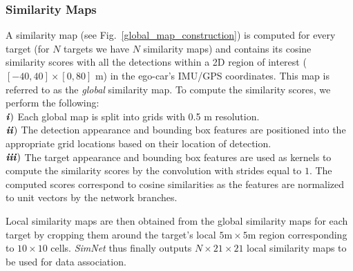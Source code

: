 \documentclass[letterpaper, 10 pt, conference]{ieeeconf}
\begin{document}
\subsubsection{Similarity Maps}
 A similarity map (see Fig.~\ref{global_map_construction}) is computed for every target (for $N$ targets we have $N$ similarity maps) and contains its cosine similarity scores with all the detections within a 2D region of interest ($\left[ -40,40 \right] \times \left [ 0,80\right]$ \si{\m}) in the ego-car's IMU/GPS coordinates. This map is referred to as the \textit{global} similarity map. To compute the similarity scores, we perform the following:
 \\ $\textbf{\textit{i}})$ Each global map is split into grids with 0.5 \si{\m} resolution.
 \\ $\textbf{\textit{ii}})$ The detection appearance and bounding box features are positioned into the appropriate grid locations based on their location of detection.
 \\ $\textbf{\textit{iii}})$ The target appearance and bounding box features are used as kernels to compute the similarity scores by the convolution with strides equal to $1$. The computed scores correspond to cosine similarities as the features are normalized to unit vectors by the network branches. 
 \par Local similarity maps are then obtained from the global similarity maps for each target by cropping them around the target's local $5\si{\m}\times5\si{\m}$ region corresponding to $10\times10$ cells. \textit{SimNet} thus finally outputs $N\times21\times21$ local similarity maps to be used for data association.
 
\end{document}
